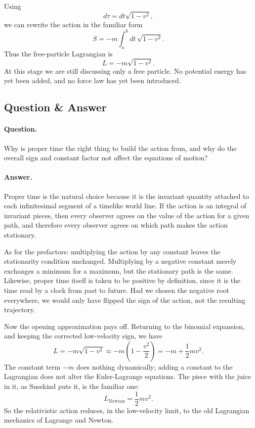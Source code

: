 Using
\begin{equation}
d\tau = dt\sqrt{1-v^2},
\end{equation}
we can rewrite the action in the familiar form
\begin{equation}
S=-m\int_a^b dt\,\sqrt{1-v^2}.
\end{equation}
Thus the free-particle Lagrangian is
\begin{equation}
L=-m\sqrt{1-v^2}.
\end{equation}
At this stage we are still discussing only a free particle. No potential energy has yet been added, and no force law has yet been introduced.

\subsection{Question \& Answer}

\paragraph{Question.}
Why is proper time the right thing to build the action from, and why do the overall sign and constant factor not affect the equations of motion?

\paragraph{Answer.}
Proper time is the natural choice because it is the invariant quantity attached to each infinitesimal segment of a timelike world line. If the action is an integral of invariant pieces, then every observer agrees on the value of the action for a given path, and therefore every observer agrees on which path makes the action stationary.

As for the prefactors: multiplying the action by any constant leaves the stationarity condition unchanged. Multiplying by a negative constant merely exchanges a minimum for a maximum, but the stationary path is the same. Likewise, proper time itself is taken to be positive by definition, since it is the time read by a clock from past to future. Had we chosen the negative root everywhere, we would only have flipped the sign of the action, not the resulting trajectory.

Now the opening approximation pays off. Returning to the binomial expansion, and keeping the corrected low-velocity sign, we have
\begin{equation}
L
=
-m\sqrt{1-v^2}
\approx
-m\left(1-\frac{v^2}{2}\right)
=
-m+\frac12 mv^2.
\end{equation}
The constant term \(-m\) does nothing dynamically; adding a constant to the Lagrangian does not alter the Euler-Lagrange equations. The piece with the juice in it, as Susskind puts it, is the familiar one:
\begin{equation}
L_{\text{Newton}}=\frac12 mv^2.
\end{equation}
So the relativistic action reduces, in the low-velocity limit, to the old Lagrangian mechanics of Lagrange and Newton.

